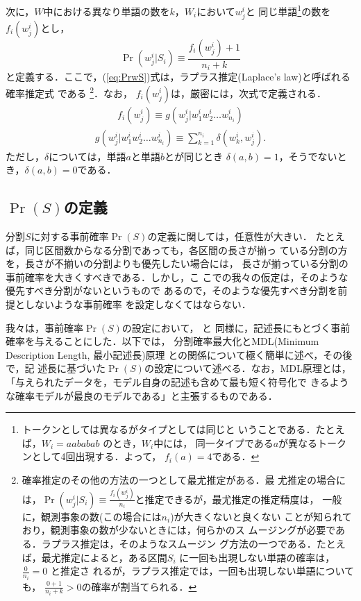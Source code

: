 次に，$W$中における異なり単語の数を$k$，$W_i$において$w^i_j$と
同じ単語\footnote{トークンとしては異なるがタイプとしては同じと
  いうことである．たとえば，$W_ i= aababab$ のとき，$W_i$中には，
  同一タイプである$a$が異なるトークンとして4回出現する．よって，
  $f_i(a) = 4$である．}の数を$f_i(w^i_j)$とし，
\begin{equation}
  \label{eq:PrwS}
  \Pr(w^i_j|S_i) \equiv \frac{f_i(w^i_j)+1}{n_i+k}
\end{equation}
と定義する．ここで，(\ref{eq:PrwS})式は，ラプラス推定(Laplace's
law)と呼ばれる確率推定式
\cite{manning99:_found_statis_natur_languag_proces}である
\footnote{確率推定のその他の方法の一つとして最尤推定がある．最
  尤推定の場合には，$\Pr(w^i_j|S_i) \equiv
  \frac{f_i(w^i_j)}{n_i}$と推定できるが，最尤推定の推定精度は，
  一般に，観測事象の数(この場合には$n_i$)が大きくないと良くない
  ことが知られており，観測事象の数が少ないときには，何らかのス
  ムージングが必要である．ラプラス推定は，そのようなスムージン
  グ方法の一つである．たとえば，最尤推定によると，ある区間$S_i$
  に一回も出現しない単語の確率は，$\frac{0}{n_i} = 0$ と推定さ
  れるが，ラプラス推定では，一回も出現しない単語についても，
  $\frac{0+1}{n_i+k} > 0$の確率が割当てられる．}．なお，
$f_i(w^i_j)$は，厳密には，次式で定義される．
\begin{eqnarray}
  \label{eq:f}
  f_i(w^i_j) \equiv g(w^i_j|w^i_1 w^i_2 \ldots w^i_{n_i})
\end{eqnarray}
\begin{eqnarray}
  \label{eq:g}
  g(w^i_j|w^i_1 w^i_2 \ldots w^i_{n_i}) \equiv \sum_{k=1}^{n_i} \delta(w^i_k,w^i_j).
\end{eqnarray}
ただし，$\delta$については，単語$a$と単語$b$とが同じとき
$\delta(a,b)=1$，そうでないとき，$\delta(a,b)=0$である．

\subsection{$\Pr(S)$の定義}
\label{sec:PrS}

分割$S$に対する事前確率$\Pr(S)$の定義に関しては，任意性が大きい．
たとえば，同じ区間数からなる分割であっても，各区間の長さが揃っ
ている分割の方を，長さが不揃いの分割よりも優先したい場合には，
長さが揃っている分割の事前確率を大きくすべきである．しかし，こ
こでの我々の仮定は，そのような優先すべき分割がないというもので
あるので，そのような優先すべき分割を前提としないような事前確率
を設定しなくてはならない．

我々は，事前確率$\Pr(S)$の設定において，
\cite{stolcke94:_best_model_mergin_hidden_markov_model_induc}と
同様に，記述長にもとづく事前確率を与えることにした．以下では，
分割確率最大化とMDL(Minimum Description Length, 最小記述長)原理
\cite{yamanishi92}との関係について極く簡単に述べ，その後で，記
述長に基づいた$\Pr(S)$の設定について述べる．なお，MDL原理とは，
「与えられたデータを，モデル自身の記述も含めて最も短く符号化で
きるような確率モデルが最良のモデルである」と主張するものである．

